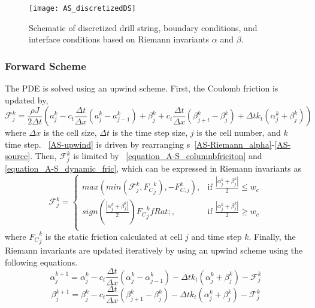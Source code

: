 \begin{figure}
  \centering
  \texttt{[image: AS\_discretizedDS]}
  \caption[Schematic of discretized drill string and boundary conditions]{Schematic of discretized drill string, boundary conditions, and interface conditions based on Riemann invariants $\alpha$ and $\beta$.}\label{AS_discretizeDS}
\end{figure}

\subsubsection{Forward Scheme}
The PDE is solved using an upwind scheme. First, the Coulomb friction is updated by,
\begin{equation}\label{AS-upwind}
  \mathcal{F}_{j}^k = \frac{\rho J}{2 \Delta t}\left(a_j^k - c_t \frac{\Delta t}{\Delta x}(a_j^k - a_{j-1}^k) + \beta_j^k + c_t \frac{\Delta t}{\Delta x}(\beta_{j+t}^k-\beta_j^k) + \Delta t k_t (\alpha_j^k + \beta_j^k)\right)
\end{equation}
where $\Delta x$ is the cell size, $\Delta t$ is the time step size, $j$ is the cell number, and $k$ time step.  \equationname~\ref{AS-upwind} is driven by rearranging \equationname{}s~\ref{AS-Riemann_alpha}-\ref{AS-source}. Then, $\mathcal{F}_{j}^k$ is limited by \equationname~\ref{equation_A-S_columnbfriciton} and \ref{equation_A-S_dynamic_fric}, which can be expressed in Riemann invariants as
\begin{equation}\label{equation_A-S_columnbfriciton_Riemann}
\mathcal{F}_{j}^k =
  \begin{cases}
      max(min(\mathcal{F}_{j}^k,{F_C}_j^k),-F_{C,j}^k) , & \mbox{if } \frac{|\alpha_j^k + \beta_j^k|}{2} \le w_c \\
      sign(\frac{|\alpha_j^k + \beta_j^k|}{2}){F_C}_j^k fRat; , & \mbox{if } \frac{|\alpha_j^k + \beta_j^k|}{2} \ge w_c \\
  \end{cases}
\end{equation}
where ${F_C}_j^k$ is the static friction calculated at cell $j$ and time step $k$. Finally, the Riemann invariants are updated iteratively by using an upwind scheme using the following equations.
\begin{equation}\label{equation_upwind_alpha}
  \alpha_j^{k+1} = \alpha_j^{k} - c_t \frac{\Delta t}{\Delta x}(\alpha_j^k - \alpha_{j-1}^k) - \Delta t k_t (\alpha_j^k + \beta_j^k) - \mathcal{F}_j^k
\end{equation}
\begin{equation}\label{equation_upwind_beta}
  \beta_j^{k+1} = \beta_j^{k} - c_t \frac{\Delta t}{\Delta x}(\beta_{j+1}^k - \beta_{j}^k) - \Delta t k_t (\alpha_j^k + \beta_j^k) - \mathcal{F}_j^k
\end{equation}

